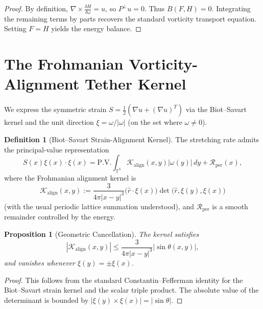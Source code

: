 \documentclass[11pt,reqno]{amsart}
\newtheorem{proposition}[theorem]{Proposition}
\theoremstyle{definition}
\newtheorem{definition}[theorem]{Definition}
\newcommand{\T}{\mathbb{T}^3}
\newcommand{\Pperp}{P^\perp}
\newcommand{\abs}[1]{\left| #1 \right|}
\begin{document}
\begin{proof}
By definition, $\nabla \times \frac{\delta H}{\delta \omega} = u$, so $\Pperp u = 0$. Thus $B(F, H) = 0$. Integrating the remaining terms by parts recovers the standard vorticity transport equation. Setting $F = H$ yields the energy balance.
\end{proof}

\section{The Frohmanian Vorticity-Alignment Tether Kernel}

We express the symmetric strain $S = \frac12(\nabla u + (\nabla u)^T)$ via the Biot--Savart kernel and the unit direction $\xi = \omega/|\omega|$ (on the set where $\omega \ne 0$).

\begin{definition}[Biot--Savart Strain-Alignment Kernel]\label{def:align_kernel}
The stretching rate admits the principal-value representation
\begin{equation}\label{eq:stretching_decomp}
S(x)\xi(x) \cdot \xi(x) = \mathrm{P.V.} \int_{\T} \mathcal{K}_{\mathrm{align}}(x, y) \abs{\omega(y)} \, dy + \mathcal{R}_{\mathrm{per}}(x),
\end{equation}
where the Frohmanian alignment kernel is
\begin{equation}\label{eq:tether_align_kernel}
\mathcal{K}_{\mathrm{align}}(x, y) := \frac{3}{4\pi \abs{x - y}^3} \bigl( \widehat{r} \cdot \xi(x) \bigr) \det\bigl( \widehat{r}, \xi(y), \xi(x) \bigr)
\end{equation}
(with the usual periodic lattice summation understood), and $\mathcal{R}_{\mathrm{per}}$ is a smooth remainder controlled by the energy.
\end{definition}

\begin{proposition}[Geometric Cancellation]\label{prop:geom_cancellation}
The kernel satisfies
\[
\abs{\mathcal{K}_{\mathrm{align}}(x, y)} \le \frac{3}{4\pi \abs{x - y}^3} \abs{\sin \theta(x, y)},
\]
and vanishes whenever $\xi(y) = \pm \xi(x)$.
\end{proposition}

\begin{proof}
This follows from the standard Constantin--Fefferman identity for the Biot--Savart strain kernel and the scalar triple product. The absolute value of the determinant is bounded by $|\xi(y) \times \xi(x)| = |\sin\theta|$.
\end{proof}
\end{document}

